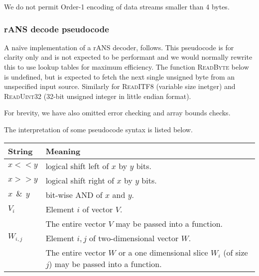 \documentclass[a4paper]{article}
\begin{document}
We do not permit Order-1 encoding of data streams smaller than 4
bytes.

\newpage
\subsubsection*{rANS decode pseudocode}

A na\"ive implementation of a rANS decoder, follows.
This pseudocode is for clarity only and is not expected to be performant and we would normally rewrite this to use lookup tables for maximum efficiency.
The function \textsc{ReadByte} below is undefined, but is expected to fetch the next single unsigned byte from an unspecified input source.  Similarly for \textsc{ReadITF8} (variable size inetger) and \textsc{ReadUint32} (32-bit unsigned integer in little endian format).

For brevity, we have also omitted error checking and array bounds checks.

The interpretation of some pseudocode syntax is listed below.

\begin{tabular}{ll}
\textbf{String} & \textbf{Meaning} \\
\hline
$x << y$ & logical shift left of $x$ by $y$ bits. \\
$x >> y$ & logical shift right of $x$ by $y$ bits.\\
$x\ \ \&\ \ y$ & bit-wise AND of $x$ and $y$.\\
$V_i$ & Element $i$ of vector $V$.\\
      & The entire vector $V$ may be passed into a function.\\
$W_{i,j}$ & Element $i,j$ of two-dimensional vector $W$.\\
          & The entire vector $W$ or a one dimensional slice $W_i$ (of size $j$) may be passed into a function.\\
\end{tabular}

\vskip 0.5cm

\begin{algorithmic}[1]
\settowidth{\maxwidth}{$n\_out$}
\State {} 
\State {} 
\State {} 
\State {}
  \State {}
\Else
  \State {}
\EndIf
\EndProcedure
\end{algorithmic}
\end{document}
